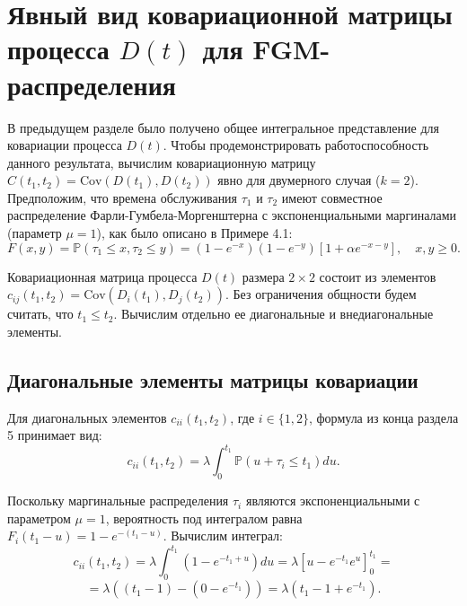 \documentclass[12pt]{article}
\theoremstyle{plain}
\theoremstyle{definition}
\theoremstyle{remark}
\begin{document}
\newpage

\section[Явный вид ковариационной матрицы процесса $D(t)$ \protect\newline для FGM-распределения]{Явный вид ковариационной матрицы процесса $D(t)$ для FGM-распределения}

В предыдущем разделе было получено общее интегральное представление для ковариации процесса $D(t)$. Чтобы продемонстрировать работоспособность данного результата, вычислим ковариационную матрицу $C(t_1, t_2) = \text{Cov}(D(t_1), D(t_2))$ явно для двумерного случая ($k=2$). Предположим, что времена обслуживания $\tau_1$ и $\tau_2$ имеют совместное распределение Фарли-Гумбела-Моргенштерна с экспоненциальными маргиналами (параметр $\mu=1$), как было описано в Примере 4.1:
\begin{equation}
    F(x, y) = \mathbb{P}(\tau_1 \le x, \tau_2 \le y) = (1 - e^{-x})(1 - e^{-y}) \left[ 1 + \alpha e^{-x-y} \right], \quad x, y \ge 0.
\end{equation}

Ковариационная матрица процесса $D(t)$ размера $2 \times 2$ состоит из элементов $c_{ij}(t_1, t_2) = \text{Cov}(D_i(t_1), D_j(t_2))$. Без ограничения общности будем считать, что $t_1 \le t_2$. Вычислим отдельно ее диагональные и внедиагональные элементы.

\subsection{Диагональные элементы матрицы ковариации}
Для диагональных элементов $c_{ii}(t_1, t_2)$, где $i \in \{1, 2\}$, формула из конца раздела 5 принимает вид:
\begin{equation}
    c_{ii}(t_1, t_2) = \lambda \int_0^{t_1} \mathbb{P}(u + \tau_i \le t_1) du.
\end{equation}

Поскольку маргинальные распределения $\tau_i$ являются экспоненциальными с параметром $\mu=1$, вероятность под интегралом равна $F_i(t_1 - u) = 1 - e^{-(t_1-u)}$. Вычислим интеграл:
\[
    c_{ii}(t_1, t_2) = \lambda \int_0^{t_1} \left( 1 - e^{-t_1+u} \right) du = \lambda \left[ u - e^{-t_1}e^u \right]_0^{t_1} = 
\]
\begin{equation}
    = \lambda \left( (t_1 - 1) - (0 - e^{-t_1}) \right) = \lambda (t_1 - 1 + e^{-t_1}).
\end{equation}
\end{document}
